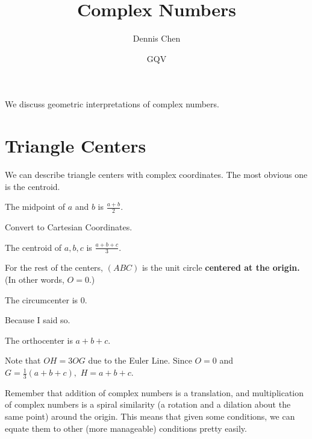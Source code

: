 \documentclass{article}
\title{Complex Numbers}
\author{Dennis Chen}
\date{GQV}
\begin{document}
\maketitle


We discuss geometric interpretations of complex numbers.

\section{Triangle Centers}
We can describe triangle centers with complex coordinates. The most obvious one is the centroid.

\begin{theo}[Midpoint]
The midpoint of $a$ and $b$ is $\frac{a+b}{2}.$
\end{theo}

\begin{pro}
Convert to Cartesian Coordinates.
\end{pro}

\begin{theo}[Centroid]
The centroid of $a,b,c$ is $\frac{a+b+c}{3}.$
\end{theo}

For the rest of the centers, $(ABC)$ is the unit circle \textbf{centered at the origin.} (In other words, $O=0.$)

\begin{theo}[Circumcenter]
The circumcenter is $0.$
\end{theo}

\begin{pro}
Because I said so.
\end{pro}

\begin{theo}[Orthocenter]
The orthocenter is $a+b+c.$
\end{theo}

\begin{pro}
Note that $OH=3OG$ due to the Euler Line. Since $O=0$ and $G=\frac{1}{3}(a+b+c),$ $H=a+b+c.$
\end{pro}

Remember that addition of complex numbers is a translation, and multiplication of complex numbers is a spiral similarity (a rotation and a dilation about the same point) around the origin. This means that given some conditions, we can equate them to other (more manageable) conditions pretty easily.
\end{document}
